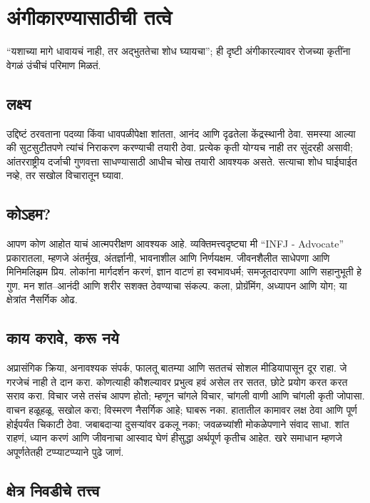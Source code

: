 \chapter{अंगीकारण्यासाठीची तत्वे}

“यशाच्या मागे धावायचं नाही, तर अद्भुततेचा शोध घ्यायचा”; ही दृष्टी अंगीकारल्यावर रोजच्या कृतींना वेगळं उंचीचं परिमाण मिळतं.

\section*{लक्ष्य}

उद्दिष्टं ठरवताना पदव्या किंवा धावपळीपेक्षा शांतता, आनंद आणि दृढतेला केंद्रस्थानी ठेवा. समस्या आल्या की सुटसुटीतपणे त्यांचं निराकरण करण्याची तयारी ठेवा. प्रत्येक कृती योग्यच नाही तर सुंदरही असावी; आंतरराष्ट्रीय दर्जाची गुणवत्ता साधण्यासाठी आधीच चोख तयारी आवश्यक असते. सत्याचा शोध घाईघाईत नव्हे, तर सखोल विचारातून घ्यावा.

\section*{कोऽहम?}

आपण कोण आहोत याचं आत्मपरीक्षण आवश्यक आहे. व्यक्तिमत्त्वदृष्ट्या मी “INFJ - Advocate” प्रकारातला, म्हणजे अंतर्मुख, अंतर्ज्ञानी, भावनाशील आणि निर्णयक्षम. जीवनशैलीत साधेपणा आणि मिनिमलिझम प्रिय. लोकांना मार्गदर्शन करणं, ज्ञान वाटणं हा स्वभावधर्म; समजूतदारपणा आणि सहानुभूती हे गुण. मन शांत–आनंदी आणि शरीर सशक्त ठेवण्याचा संकल्प. कला, प्रोग्रॅमिंग, अध्यापन आणि योग; या क्षेत्रांत नैसर्गिक ओढ.

\section*{काय करावे, करू नये}

अप्रासंगिक क्रिया, अनावश्यक संपर्क, फालतू बातम्या आणि सततचं सोशल मीडियापासून दूर राहा. जे गरजेचं नाही ते दान करा. कोणत्याही कौशल्यावर प्रभुत्व हवं असेल तर सतत, छोटे प्रयोग करत करत सराव करा. विचार जसे तसंच आपण होतो; म्हणून चांगले विचार, चांगली वाणी आणि चांगली कृती जोपासा. वाचन हळूहळू, सखोल करा; विस्मरण नैसर्गिक आहे; घाबरू नका. हातातील कामावर लक्ष ठेवा आणि पूर्ण होईपर्यंत चिकाटी ठेवा. जबाबदाऱ्या दुसऱ्यांवर ढकलू नका; जवळच्यांशी मोकळेपणाने संवाद साधा. शांत राहणं, ध्यान करणं आणि जीवनाचा आस्वाद घेणं हीसुद्धा अर्थपूर्ण कृतीच आहेत. खरे समाधान म्हणजे अपूर्णतेतही टप्प्याटप्प्याने पुढे जाणं.

\section*{क्षेत्र निवडीचे तत्त्व}

